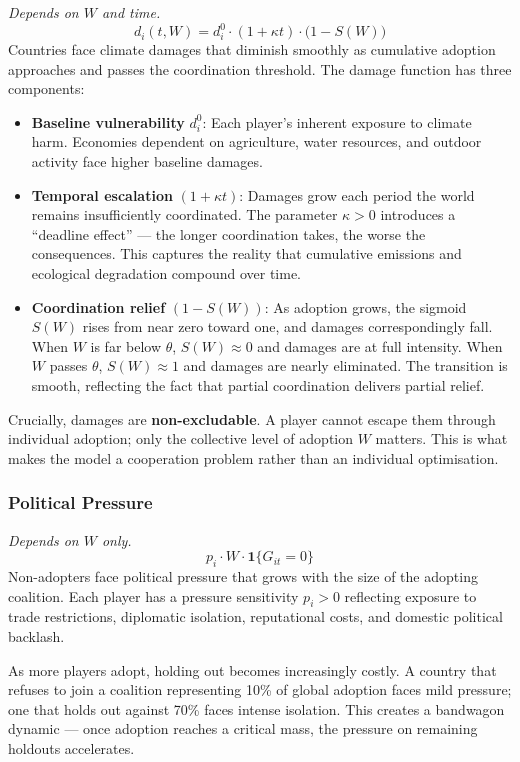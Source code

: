 \documentclass[12pt,a4paper]{article}
\begin{document}
\textit{Depends on $W$ and time.}
\[
  d_i(t, W) = d_i^0 \cdot (1 + \kappa t) \cdot \bigl(1 - S(W)\bigr)
\]
Countries face climate damages that diminish smoothly as cumulative adoption approaches and passes the coordination threshold. The damage function has three components:
\begin{itemize}
  \item \textbf{Baseline vulnerability} $d_i^0$: Each player's inherent exposure to climate harm. Economies dependent on agriculture, water resources, and outdoor activity face higher baseline damages.
  \item \textbf{Temporal escalation} $(1 + \kappa t)$: Damages grow each period the world remains insufficiently coordinated. The parameter $\kappa > 0$ introduces a ``deadline effect'' --- the longer coordination takes, the worse the consequences. This captures the reality that cumulative emissions and ecological degradation compound over time.
  \item \textbf{Coordination relief} $(1 - S(W))$: As adoption grows, the sigmoid $S(W)$ rises from near zero toward one, and damages correspondingly fall. When $W$ is far below $\theta$, $S(W) \approx 0$ and damages are at full intensity. When $W$ passes $\theta$, $S(W) \approx 1$ and damages are nearly eliminated. The transition is smooth, reflecting the fact that partial coordination delivers partial relief.
\end{itemize}

Crucially, damages are \textbf{non-excludable}. A player cannot escape them through individual adoption; only the collective level of adoption $W$ matters. This is what makes the model a cooperation problem rather than an individual optimisation.

\subsubsection{Political Pressure}

\textit{Depends on $W$ only.}
\[
  p_i \cdot W \cdot \mathbf{1}\{G_{it} = 0\}
\]
Non-adopters face political pressure that grows with the size of the adopting coalition. Each player has a pressure sensitivity $p_i > 0$ reflecting exposure to trade restrictions, diplomatic isolation, reputational costs, and domestic political backlash.

As more players adopt, holding out becomes increasingly costly. A country that refuses to join a coalition representing 10\% of global adoption faces mild pressure; one that holds out against 70\% faces intense isolation. This creates a bandwagon dynamic --- once adoption reaches a critical mass, the pressure on remaining holdouts accelerates.
\end{document}
